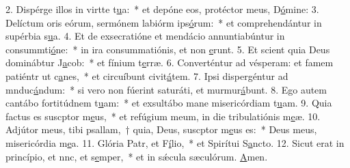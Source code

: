 2. Dispérge illos in virtte t\uline{u}a:~* et depóne eos, protéctor meus, D\uline{ó}mine:
3. Delíctum oris eórum, sermónem labiórm ips\uline{ó}rum:~* et comprehendántur in supérbia s\uline{u}a.
4. Et de exsecratióne et mendácio annuntiabúntur in consummti\uline{ó}ne:~* in ira consummatiónis, et non \uline{e}runt.
5. Et scient quia Deus dominábtur J\uline{a}cob:~* et fínium t\uline{e}rræ.
6. Converténtur ad vésperam: et famem patiéntr ut c\uline{a}nes,~* et circuíbunt civit\uline{á}tem.
7. Ipsi dispergéntur ad mnduc\uline{á}ndum:~* si vero non fúerint saturáti, et murmur\uline{á}bunt.
8. Ego autem cantábo fortitúdnem t\uline{u}am:~* et exsultábo mane misericórdiam t\uline{u}am.
9. Quia factus es suscptor m\uline{e}us,~* et refúgium meum, in die tribulatiónis m\uline{e}æ.
10. Adjútor meus, tibi psallam,~† quia, Deus, suscptor m\uline{e}us es:~* Deus meus, misericórdia m\uline{e}a.
11. Glória Patr, et F\uline{í}lio,~* et Spirítui S\uline{a}ncto.
12. Sicut erat in princípio, et nnc, et s\uline{e}mper,~* et in sǽcula sæculórum. \uline{A}men.
